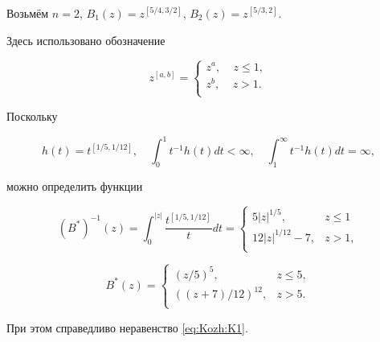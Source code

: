 \begin{example}[1]Возьмём $n=2$, $B_1(z)=z^{[{5}/{4}, {3}/{2}]}$, $B_2(z)=z^{[{5}/{3}, 2]}$.

Здесь использовано обозначение

$$

z^{[a,b]}=

\left \{

\begin{array}{ll}

z^a, \  \mbox{  } \ z\leq 1,\\

z^b, \  \mbox{  } \ z> 1.\\

\end{array}\right.

$$

Поскольку

$$h(t)=t^{[{1}/{5},{1}/{12}]},\quad \int_0^1t^{-1}{h(t)}dt<\infty,\quad \int_1^{\infty}t^{-1}{h(t)}dt=\infty,$$

 можно определить функции

$$(B^{*})^{-1}(z)=\int_0^{|z|}\frac{t^{[{1}/{5}, {1}/{12}]}}{t} dt=

\left \{

\begin{array}{ll}

5|z|^{{1}/{5}}, & z\leq1\\

12|z|^{{1}/{12}}-7, & z>1,\\

\end{array}\right.$$

$$

B^{*}(z)=

\left\{

\begin{array}{ll}

(z/5)^5, & z\leq 5,\\

((z+7)/12)^{12}, & z>5.\\

\end{array}\right.

$$

\end{example}

При этом справедливо неравенство \eqref{eq:Kozh:K1}.



\smallskip



